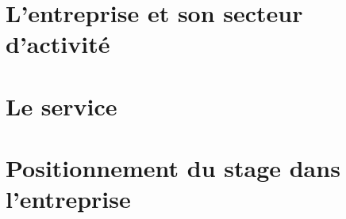 \section*{L'entreprise et son secteur d'activité}
\subparagraph{}
\begin{center}
\end{center} 
\paragraph{}
\paragraph{}

\begin{center}
\end{center}
\paragraph{}
\subparagraph{}
\section*{Le service}
\subparagraph{}
\subparagraph{}
\subparagraph{}

\paragraph{}
\subparagraph{}
\subparagraph{}


\section*{Positionnement du stage dans l'entreprise}
\subparagraph{}


\paragraph{}
\paragraph{}
\subparagraph{}
\subparagraph{}
\subparagraph{}
\subparagraph{}
\subparagraph{}
\subparagraph{}
\newpage
